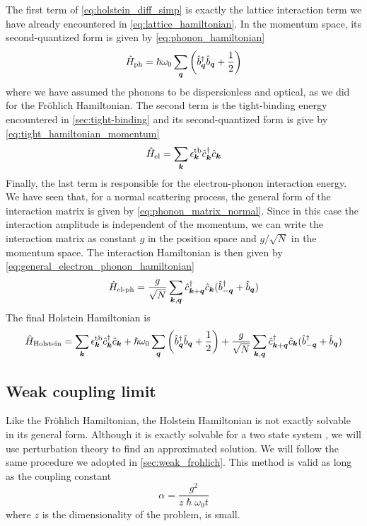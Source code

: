 The first term of \cref{eq:holstein_diff_simp} is exactly the lattice interaction term we have already encountered in \cref{eq:lattice_hamiltonian}. In the momentum space, its second-quantized form is given by \cref{eq:phonon_hamiltonian}
\begin{equation}
    \hat{H}_\text{ph} = \hslash \omega_0\sum_{\mathbf{\boldsymbol{q}}}  \left( \hat{b}^\dagger_{\mathbf{\boldsymbol{q}}} \hat{b}_{\mathbf{\boldsymbol{q}}} + \frac{1}{2} \right)
\end{equation}
where we have assumed the phonons to be dispersionless and optical, as we did for the Fröhlich Hamiltonian. The second term is the tight-binding energy encountered in \cref{sec:tight-binding} and its second-quantized form is give by \cref{eq:tight_hamiltonian_momentum}
\begin{equation}
    \hat{H}_\text{el} = \sum_{\mathbf{\boldsymbol{k}}} \epsilon_{\mathbf{\boldsymbol{k}}}^\text{tb} \hat{c}^\dagger_{\mathbf{\boldsymbol{k}}}\hat{c}_{\mathbf{\boldsymbol{k}}}
\end{equation}
Finally, the last term is responsible for the electron-phonon interaction energy. We have seen that, for a normal scattering process, the general form of the interaction matrix is given by \cref{eq:phonon_matrix_normal}. Since in this case the interaction amplitude is independent of the momentum, we can write the interaction matrix as constant $g$ in the position space and $g / \sqrt{N}$ in the momentum space. The interaction Hamiltonian is then given by \cref{eq:general_electron_phonon_hamiltonian}
\begin{equation}
    \hat{H}_\text{el-ph} = \frac{g}{\sqrt{N}}\sum_{\mathbf{\boldsymbol{k}}, \mathbf{\boldsymbol{q}}} \hat{c}^\dagger_{\mathbf{\boldsymbol{k}}+\mathbf{\boldsymbol{q}}} \hat{c}_{\mathbf{\boldsymbol{k}}} (\hat{b}^\dagger_{-\mathbf{\boldsymbol{q}}} + \hat{b}_{\mathbf{\boldsymbol{q}}})
\end{equation}
The final Holstein Hamiltonian is
\begin{equation}
    \hat{H}_\text{Holstein} = \sum_{\mathbf{\boldsymbol{k}}} \epsilon_{\mathbf{\boldsymbol{k}}}^\text{tb} \hat{c}^\dagger_{\mathbf{\boldsymbol{k}}}\hat{c}_{\mathbf{\boldsymbol{k}}} + \hslash \omega_0\sum_{\mathbf{\boldsymbol{q}}}  \left( \hat{b}^\dagger_{\mathbf{\boldsymbol{q}}} \hat{b}_{\mathbf{\boldsymbol{q}}} + \frac{1}{2} \right) + \frac{g}{\sqrt{N}}\sum_{\mathbf{\boldsymbol{k}}, \mathbf{\boldsymbol{q}}} \hat{c}^\dagger_{\mathbf{\boldsymbol{k}}+\mathbf{\boldsymbol{q}}} \hat{c}_{\mathbf{\boldsymbol{k}}} (\hat{b}^\dagger_{-\mathbf{\boldsymbol{q}}} + \hat{b}_{\mathbf{\boldsymbol{q}}})
\end{equation}

\subsection{Weak coupling limit}
Like the Fröhlich Hamiltonian, the Holstein Hamiltonian is not exactly solvable in its general form. Although it is exactly solvable for a two state system \cite{tayebi2016}, we will use perturbation theory to find an approximated solution. We will follow the same procedure we adopted in \cref{sec:weak_frohlich}. This method is valid as long as the coupling constant
\begin{equation}
    \alpha = \frac{g^2}{z\hslash\omega_0t}
\end{equation}
where $z$ is the dimensionality of the problem, is small.

